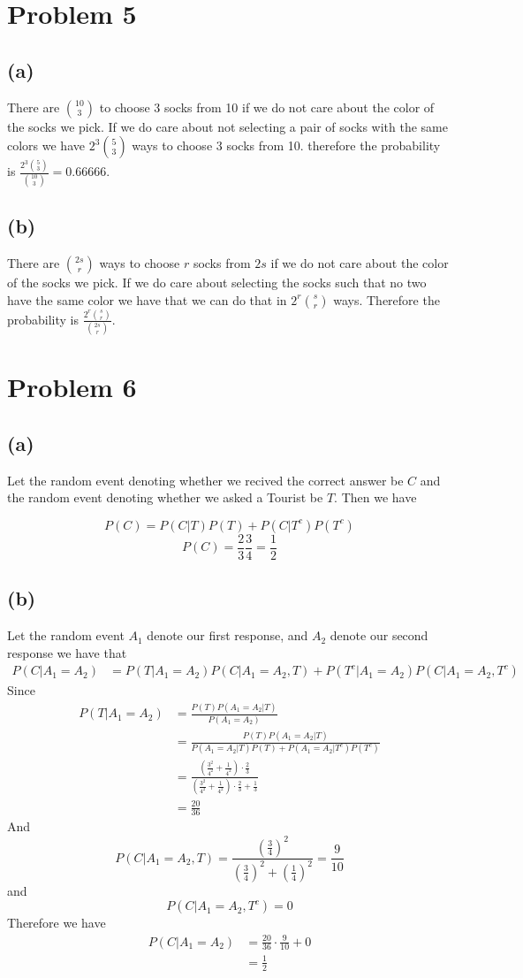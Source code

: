 \section*{Problem 5}
\subsection*{(a)}
There are $10\choose 3$ to choose 3 socks from 10 if we do not
care about the color of the socks we pick. If we do care about
not selecting a pair of socks with the same colors we have
$2^3{5\choose 3}$ ways to choose 3 socks from 10.
therefore the probability is $\frac{2^3{5\choose 3}}{{10\choose 3}}=\boxed{0.66666}$.
\subsection*{(b)}
There are $2s \choose r$ ways to choose $r$ socks from $2s$ if we do not care about the color of the socks we pick. If we do care about
selecting the socks such that no two have the same color we have that we can do that
in $2^r{s\choose r}$ ways. 
Therefore the probability is $\boxed{\frac{2^r{s\choose r}}{{2s \choose r}}}$.
\section*{Problem 6}
\subsection*{(a)}
Let the random event denoting whether we recived the correct answer 
be $C$ and the random event denoting whether we asked a Tourist be 
$T$. Then we have

$$P(C)=P(C|T)P(T)+P(C|T^c)P(T^c)$$
$$P(C)=\frac{2}{3}\frac{3}{4}=\boxed{\frac{1}{2}}$$
\subsection*{(b)}
Let the random event $A_1$ denote our first response, and $A_2$ denote our
second response we have that
\begin{align*}
    P(C|A_1=A_2)&=P(T|A_1=A_2)P(C|A_1=A_2,T)+P(T^c|A_1=A_2)P(C|A_1=A_2,T^c)
\end{align*}
Since 
\begin{align*}
    P(T|A_1=A_2)&=\frac{P(T)P(A_1=A_2|T)}{P(A_1=A_2)}\\
    &=\frac{P(T)P(A_1=A_2|T)}{P(A_1=A_2|T)P(T)+P(A_1=A_2|T^c)P(T^c)}\\
    &=\frac{\left(\frac{3^2}{4^2}+\frac{1}{4^2}\right)\cdot\frac{2}{3}}{\left(\frac{3^2}{4^2}+\frac{1}{4^2}\right)\cdot\frac{2}{3}+\frac{1}{3}}\\
    &=\frac{20}{36}
\end{align*}
And 
$$P(C|A_1=A_2,T)=\frac{\left(\frac{3}{4}\right)^2}{\left(\frac{3}{4}\right)^2+\left(\frac{1}{4}\right)^2}=\frac{9}{10}$$
and 
$$P(C|A_1=A_2,T^c)=0$$
Therefore we have
\begin{align*}
    P(C|A_1=A_2)&=\frac{20}{36}\cdot\frac{9}{10}+0\\
    &=\boxed{\frac{1}{2}}
\end{align*}
